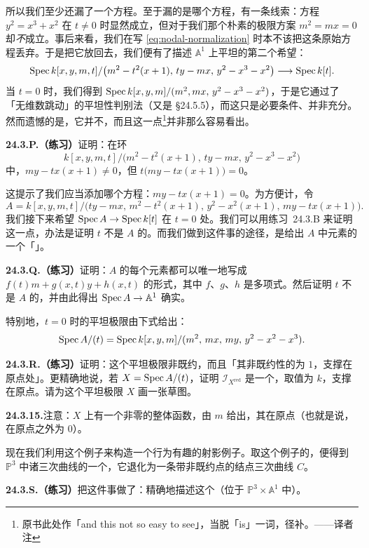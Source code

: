 所以我们至少还漏了一个方程。至于漏的是哪个方程，有一条线索：方程 $y^2=x^3+x^2$ 在 $t\ne 0$ 时显然成立，但对于我们那个朴素的极限方案 $m^2=mx=0$ 却\emph{不}成立。事后来看，我们在写 \eqref{eq:nodal-normalization} 时本不该把这条原始方程丢弃。于是把它放回去，我们便有了描述 $\mathbb{A}^1$ 上平坦\trFamily{}的第二个希望：
\[
\operatorname{Spec} k[x,y,m,t]/\bigl(m^2-t^2(x+1),\,ty-mx,\,y^2-x^3-x^2\bigr)\longrightarrow\operatorname{Spec} k[t].
\]
当 $t=0$ 时，我们得到 $\operatorname{Spec} k[x,y,m]/(m^2,mx,\,y^2-x^3-x^2)$，于是它通过了「无维数跳动」的平坦性判别法（又是 \S24.5.5），而这只是必要条件、并非充分。然而遗憾的是，它并不\trFlat，而且这一点\footnote{原书此处作「and this not so easy to see」，当脱「is」一词，径补。——译者注}并非那么容易看出。

\textbf{24.3.P.（练习）}\quad 证明：在环
\[
k[x,y,m,t]/\bigl(m^2-t^2(x+1),\,ty-mx,\,y^2-x^3-x^2\bigr)
\]
中，$my-tx(x+1)\ne 0$，但 $t\bigl(my-tx(x+1)\bigr)=0$。

这提示了我们应当添加哪个方程：$my-tx(x+1)=0$。为方便计，令
\[
A=k[x,y,m,t]/\bigl(ty-mx,\,m^2-t^2(x+1),\,y^2-x^2(x+1),\,my-tx(x+1)\bigr).
\]
我们接下来希望 $\operatorname{Spec} A\to\operatorname{Spec} k[t]$ 在 $t=0$ 处\trFlat。我们可以用\mbox{练习~24.3.B} 来证明这一点，办法是证明 $t$ 不是 $A$ 的\trZerodivisor。而我们做到这件事的途径，是给出 $A$ 中元素的一个「\trNormalForm」。

\textbf{24.3.Q.（练习）}\quad 证明：$A$ 的每个元素都可以唯一地写成 $f(t)m+g(x,t)y+h(x,t)$ 的形式，其中 $f$、$g$、$h$ 是多项式。然后证明 $t$ 不是 $A$ 的\trZerodivisor，并由此得出 $\operatorname{Spec} A\to\mathbb{A}^1$ 确实\trFlat。

特别地，$t=0$ 时的平坦极限由下式给出：
\[
\operatorname{Spec} A/(t)=\operatorname{Spec} k[x,y,m]/(m^2,\,mx,\,my,\,y^2-x^2-x^3).
\]

\textbf{24.3.R.（练习）}\quad 证明：这个平坦极限非既约，而且「其非既约性的\trLength{}为 $1$，支撑在原点处」。更精确地说，若 $X=\operatorname{Spec} A/(t)$，证明 $\mathscr{I}_{X^{\mathrm{red}}}$ 是一个\trSkyscraperSheaf，取值为 $k$，支撑在原点。请为这个平坦极限 $X$ 画一张草图。

\textbf{24.3.15.}\quad 注意：$X$ 上有一个非零的整体函数，由 $m$ 给出，其\trSupport{}在原点（也就是说，在原点之外为 $0$）。

现在我们利用这个例子来构造一个行为有趣的射影例子。取这个例子的\trProjectiveCompletion，便得到 $\mathbb{P}^3$ 中诸三次曲线的一个\trFamily，它退化为一条带非既约点的结点三次曲线 $C$。

\textbf{24.3.S.（练习）}\quad 把这件事做了：精确地描述这个\trFamily（位于 $\mathbb{P}^3\times\mathbb{A}^1$ 中）。

